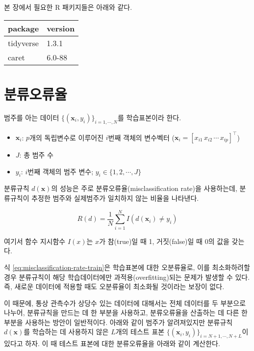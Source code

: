 \documentclass[
]{book}
\providecommand{\tightlist}{%
  \setlength{\itemsep}{0pt}\setlength{\parskip}{0pt}}
\begin{document}
본 장에서 필요한 R 패키지들은 아래와 같다.

\begin{tabular}{l|l}
\hline
package & version\\
\hline
tidyverse & 1.3.1\\
\hline
caret & 6.0-88\\
\hline
\end{tabular}

\hypertarget{classifier-evaluation-misclassification-rate}{%
\section{분류오류율}\label{classifier-evaluation-misclassification-rate}}

범주를 아는 데이터 \(\{(\mathbf{x}_i, y_i)\}_{i = 1, \cdots, N}\)를 학습표본이라 한다.

\begin{itemize}
\tightlist
\item
  \(\mathbf{x}_i\): \(p\)개의 독립변수로 이루어진 \(i\)번째 객체의 변수벡터 (\(\mathbf{x}_i = [x_{i1} \, x_{i2} \, \cdots \, x_{ip}]^\top\))
\item
  \(J\): 총 범주 수
\item
  \(y_i\): \(i\)번째 객체의 범주 변수; \(y_i \in \{1, 2, \cdots, J\}\)
\end{itemize}

분류규칙 \(d(\mathbf{x})\)의 성능은 주로 분류오류율(misclassification rate)을 사용하는데, 분류규칙이 추정한 범주와 실제범주가 일치하지 않는 비율을 나타낸다.

\begin{equation}
R(d) = \frac{1}{N} \sum_{i = 1}^{N} I(d(\mathbf{x}_i) \neq y_i)
\label{eq:misclassification-rate-train}
\end{equation}

여기서 함수 지시함수 \(I(x)\)는 \(x\)가 참(true)일 때 1, 거짓(false)일 때 0의 값을 갖는다.

식 \eqref{eq:misclassification-rate-train}은 학습표본에 대한 오분류율로, 이를 최소화하려할 경우 분류규칙이 해당 학습데이터에만 과적용(overfitting)되는 문제가 발생할 수 있다. 즉, 새로운 데이터에 적용할 때도 오분류율이 최소화될 것이라는 보장이 없다.

이 때문에, 통상 관측수가 상당수 있는 데이터에 대해서는 전체 데이터를 두 부분으로 나누어, 분류규칙을 만드는 데 한 부분을 사용하고, 분류오류율을 산출하는 데 다른 한 부분을 사용하는 방안이 일반적이다. 아래와 같이 범주가 알려져있지만 분류규칙 \(d(\mathbf{x})\)를 학습하는 데 사용하지 않은 \(L\)개의 테스트 표본 \(\{(\mathbf{x}_i, y_i)\}_{i = N + 1, \cdots, N + L}\)이 있다고 하자. 이 때 테스트 표본에 대한 분류오류율을 아래와 같이 계산한다.
\end{document}
